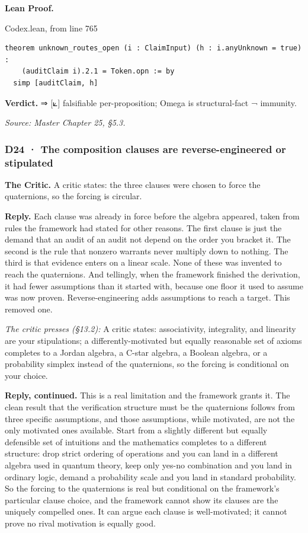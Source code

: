 \documentclass[10pt,twocolumn]{article}
\begin{document}
\textbf{Lean Proof.}

\begin{leanexcerpt}{Codex.lean, from line 765}
\begin{lstlisting}[style=leanx,firstnumber=765]
theorem unknown_routes_open (i : ClaimInput) (h : i.anyUnknown = true) :
    (auditClaim i).2.1 = Token.opn := by
  simp [auditClaim, h]
\end{lstlisting}
\end{leanexcerpt}

\textbf{Verdict.} ⇒ {[}⟀{]} falsifiable per-proposition; Omega is
structural-fact ¬ immunity.

\emph{Source: Master Chapter 25, §5.3.}

\hypertarget{d24-the-composition-clauses-are-reverse-engineered-or-stipulated}{%
\subsubsection{D24 · The composition clauses are reverse-engineered or
stipulated}\label{d24-the-composition-clauses-are-reverse-engineered-or-stipulated}}

\textbf{The Critic.} A critic states: the three clauses were chosen to
force the quaternions, so the forcing is circular.

\textbf{Reply.} Each clause was already in force before the algebra
appeared, taken from rules the framework had stated for other reasons.
The first clause is just the demand that an audit of an audit not depend
on the order you bracket it. The second is the rule that nonzero
warrants never multiply down to nothing. The third is that evidence
enters on a linear scale. None of these was invented to reach the
quaternions. And tellingly, when the framework finished the derivation,
it had fewer assumptions than it started with, because one floor it used
to assume was now proven. Reverse-engineering adds assumptions to reach
a target. This removed one.

\emph{The critic presses (§13.2):} A critic states: associativity,
integrality, and linearity are your stipulations; a
differently-motivated but equally reasonable set of axioms completes to
a Jordan algebra, a C-star algebra, a Boolean algebra, or a probability
simplex instead of the quaternions, so the forcing is conditional on
your choice.

\textbf{Reply, continued.} This is a real limitation and the framework
grants it. The clean result that the verification structure must be the
quaternions follows from three specific assumptions, and those
assumptions, while motivated, are not the only motivated ones available.
Start from a slightly different but equally defensible set of intuitions
and the mathematics completes to a different structure: drop strict
ordering of operations and you can land in a different algebra used in
quantum theory, keep only yes-no combination and you land in ordinary
logic, demand a probability scale and you land in standard probability.
So the forcing to the quaternions is real but conditional on the
framework's particular clause choice, and the framework cannot show its
clauses are the uniquely compelled ones. It can argue each clause is
well-motivated; it cannot prove no rival motivation is equally good.
\end{document}
